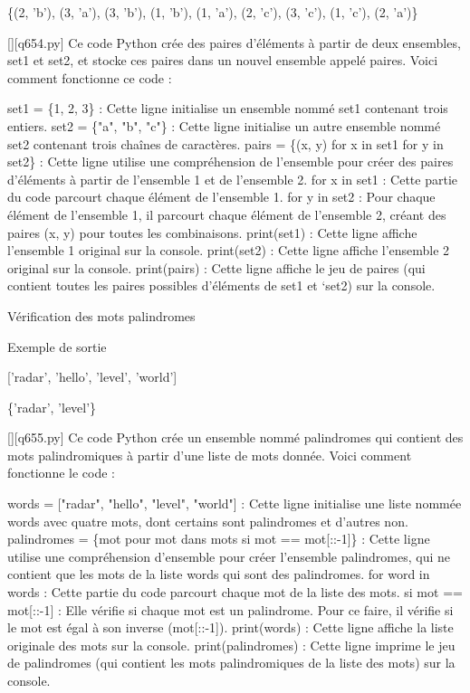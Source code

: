 \{(2, 'b'), (3, 'a'), (3, 'b'), (1, 'b'), (1, 'a'), (2, 'c'), (3, 'c'), (1, 'c'), (2, 'a')\}
        \par
        \begin{solution}
            \renewcommand{\nomfichier}{q654.py}
            \pythonfile{\chemincode \nomfichier}[][\nomfichier]
            Ce code Python crée des paires d'éléments à partir de deux ensembles, set1 et set2, et stocke ces paires dans un nouvel ensemble appelé paires. Voici comment fonctionne ce code :

    set1 = \{1, 2, 3\} : Cette ligne initialise un ensemble nommé set1 contenant trois entiers.
    set2 = \{"a", "b", "c"\} : Cette ligne initialise un autre ensemble nommé set2 contenant trois chaînes de caractères.
    pairs = \{(x, y) for x in set1 for y in set2\} : Cette ligne utilise une compréhension de l'ensemble pour créer des paires d'éléments à partir de l'ensemble 1 et de l'ensemble 2.
        for x in set1 : Cette partie du code parcourt chaque élément de l'ensemble 1.
        for y in set2 : Pour chaque élément de l'ensemble 1, il parcourt chaque élément de l'ensemble 2, créant des paires (x, y) pour toutes les combinaisons.
    print(set1) : Cette ligne affiche l'ensemble 1 original sur la console.
    print(set2) : Cette ligne affiche l'ensemble 2 original sur la console.
    print(pairs) : Cette ligne affiche le jeu de paires (qui contient toutes les paires possibles d'éléments de set1 et `set2) sur la console.
        \end{solution}
        

        \question
        Vérification des mots palindromes

Exemple de sortie

['radar', 'hello', 'level', 'world']

\{'radar', 'level'\}
        \par
        \begin{solution}
            \renewcommand{\nomfichier}{q655.py}
            \pythonfile{\chemincode \nomfichier}[][\nomfichier]
            Ce code Python crée un ensemble nommé palindromes qui contient des mots palindromiques à partir d'une liste de mots donnée. Voici comment fonctionne le code :

    words = ["radar", "hello", "level", "world"] : Cette ligne initialise une liste nommée words avec quatre mots, dont certains sont palindromes et d'autres non.
    palindromes = \{mot pour mot dans mots si mot == mot[::-1]\} : Cette ligne utilise une compréhension d'ensemble pour créer l'ensemble palindromes, qui ne contient que les mots de la liste words qui sont des palindromes.
        for word in words : Cette partie du code parcourt chaque mot de la liste des mots.
        si mot == mot[::-1] : Elle vérifie si chaque mot est un palindrome. Pour ce faire, il vérifie si le mot est égal à son inverse (mot[::-1]).
    print(words) : Cette ligne affiche la liste originale des mots sur la console.
    print(palindromes) : Cette ligne imprime le jeu de palindromes (qui contient les mots palindromiques de la liste des mots) sur la console.
        \end{solution}
        

